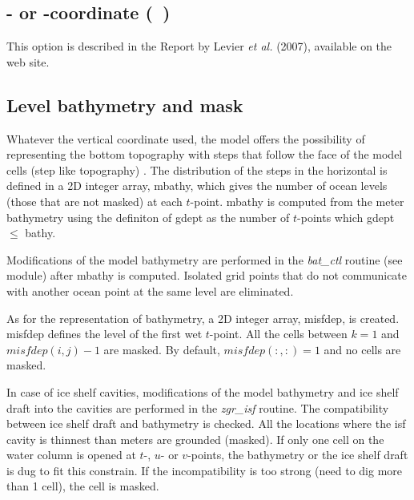 \documentclass[../main/NEMO_manual]{subfiles}
\begin{document}
\subsection{\zstar- or \sstar-coordinate (\protect{}~)}
\label{subsec:DOM_zgr_star}

This option is described in the Report by Levier \textit{et al.} (2007), available on the \NEMO web site.


\subsection{Level bathymetry and mask}
\label{subsec:DOM_msk}

Whatever the vertical coordinate used, the model offers the possibility of representing the bottom topography with
steps that follow the face of the model cells (step like topography) \citep{Madec_al_JPO96}.
The distribution of the steps in the horizontal is defined in a 2D integer array, mbathy, which
gives the number of ocean levels (\ie those that are not masked) at each $t$-point.
mbathy is computed from the meter bathymetry using the definiton of gdept as the number of $t$-points which
gdept $\leq$ bathy.

Modifications of the model bathymetry are performed in the \textit{bat\_ctl} routine (see  module) after
mbathy is computed.
Isolated grid points that do not communicate with another ocean point at the same level are eliminated.

As for the representation of bathymetry, a 2D integer array, misfdep, is created.
misfdep defines the level of the first wet $t$-point.
All the cells between $k = 1$ and $misfdep(i,j) - 1$ are masked.
By default, $misfdep(:,:) = 1$ and no cells are masked.

In case of ice shelf cavities, modifications of the model bathymetry and ice shelf draft into 
the cavities are performed in the \textit{zgr\_isf} routine.
The compatibility between ice shelf draft and bathymetry is checked.
All the locations where the isf cavity is thinnest than  meters are grounded (\ie masked).
If only one cell on the water column is opened at $t$-, $u$- or $v$-points,
the bathymetry or the ice shelf draft is dug to fit this constrain.
If the incompatibility is too strong (need to dig more than 1 cell), the cell is masked.
\end{document}
